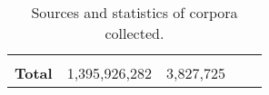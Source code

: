 \begin{table}[!ht]
{\begin{tabular}{m{2.7cm}llm{2cm}m{7cm}}
        \bottomrule
        \\
        \cmidrule{1-3}
        \textbf{Total} & 1,395,926,282 & 3,827,725\\
        \cmidrule{1-3}
    \end{tabular}}
    \caption{Sources and statistics of corpora collected.}
    \label{tab:corpusembeddings}
\end{table}



